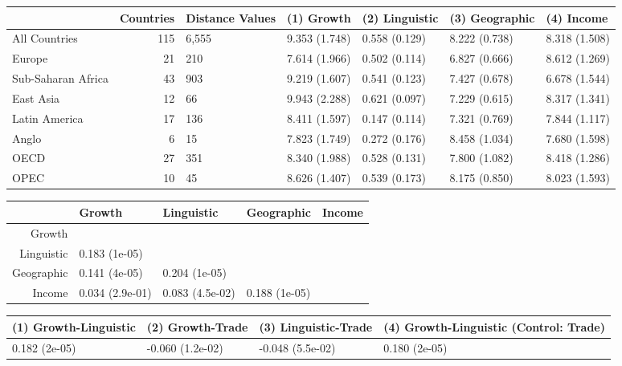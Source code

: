 \documentclass[preprint,10pt]{elsarticle}
\begin{document}
\begin{table}[ht]
\centering
\begin{tabular}{lrp{1.2cm}p{2.1cm}p{2.1cm}p{2.1cm}p{2.1cm}}
  \hline
 & Countries & Distance \hspace{20 mm} Values & (1) \hspace{20 mm} Growth & (2) \hspace{20 mm} Linguistic & (3) \hspace{20 mm} Geographic & (4) \hspace{20 mm} Income \\ 
  \hline
All Countries & 115 & 6,555 & 9.353 (1.748) & 0.558 (0.129) & 8.222 (0.738) & 8.318 (1.508) \\ 
  Europe &  21 & 210 & 7.614 (1.966) & 0.502 (0.114) & 6.827 (0.666) & 8.612 (1.269) \\ 
  Sub-Saharan Africa &  43 & 903 & 9.219 (1.607) & 0.541 (0.123) & 7.427 (0.678) & 6.678 (1.544) \\ 
  East Asia &  12 & 66 & 9.943 (2.288) & 0.621 (0.097) & 7.229 (0.615) & 8.317 (1.341) \\ 
  Latin America &  17 & 136 & 8.411 (1.597) & 0.147 (0.114) & 7.321 (0.769) & 7.844 (1.117) \\ 
  Anglo &   6 & 15 & 7.823 (1.749) & 0.272 (0.176) & 8.458 (1.034) & 7.680 (1.598) \\ 
  OECD &  27 & 351 & 8.340 (1.988) & 0.528 (0.131) & 7.800 (1.082) & 8.418 (1.286) \\ 
  OPEC &  10 & 45 & 8.626 (1.407) & 0.539 (0.173) & 8.175 (0.850) & 8.023 (1.593) \\ 
   \hline
\end{tabular}
\end{table}




\begin{table}[ht]
\centering
\begin{tabular}{rllll}
  \hline
 & Growth & Linguistic & Geographic & Income \\ 
  \hline
Growth &  &  &  &  \\ 
  Linguistic & 0.183 (1e-05) &  &  &  \\ 
  Geographic & 0.141 (4e-05) & 0.204 (1e-05) &  &  \\ 
  Income & 0.034 (2.9e-01) & 0.083 (4.5e-02) & 0.188 (1e-05) &  \\ 
   \hline
\end{tabular}
\end{table}


\begin{table}[ht]
\centering
\begin{tabular}{p{3.5cm}p{3.5cm}p{3.5cm}p{3.5cm}}
  \hline
(1) Growth-Linguistic & (2) Growth-Trade & (3) Linguistic-Trade & (4) Growth-Linguistic (Control: Trade) \\ 
  \hline
0.182 (2e-05) & -0.060 (1.2e-02) & -0.048 (5.5e-02) & 0.180 (2e-05) \\ 
   \hline
\end{tabular}
\end{table}
\end{document}
